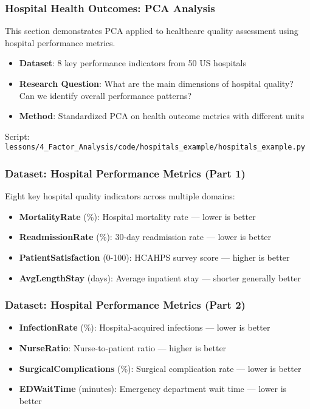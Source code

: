 \documentclass[aspectratio=169]{beamer}
\begin{document}
\begin{frame}
    \frametitle{Hospital Health Outcomes: PCA Analysis}
    This section demonstrates PCA applied to healthcare quality assessment using hospital performance metrics.
    \begin{itemize}
        \item \textbf{Dataset}: 8 key performance indicators from 50 US hospitals \pause
        \item \textbf{Research Question}: What are the main dimensions of hospital quality? Can we identify overall performance patterns? \pause
        \item \textbf{Method}: Standardized PCA on health outcome metrics with different units \pause
    \end{itemize}
    \vspace{6pt}
    Script: \texttt{lessons/4\_Factor\_Analysis/code/hospitals\_example/hospitals\_example.py}
\end{frame}

\begin{frame}
    \frametitle{Dataset: Hospital Performance Metrics (Part 1)}
    Eight key hospital quality indicators across multiple domains:
    \begin{itemize}
        \item \textbf{MortalityRate} (\%): Hospital mortality rate — lower is better \pause
        \item \textbf{ReadmissionRate} (\%): 30-day readmission rate — lower is better \pause
        \item \textbf{PatientSatisfaction} (0-100): HCAHPS survey score — higher is better \pause
        \item \textbf{AvgLengthStay} (days): Average inpatient stay — shorter generally better \pause
    \end{itemize}
\end{frame}

\begin{frame}
    \frametitle{Dataset: Hospital Performance Metrics (Part 2)}
    \begin{itemize}
        \item \textbf{InfectionRate} (\%): Hospital-acquired infections — lower is better \pause
        \item \textbf{NurseRatio}: Nurse-to-patient ratio — higher is better \pause
        \item \textbf{SurgicalComplications} (\%): Surgical complication rate — lower is better \pause
        \item \textbf{EDWaitTime} (minutes): Emergency department wait time — lower is better \pause
    \end{itemize}
\end{frame}
\end{document}
